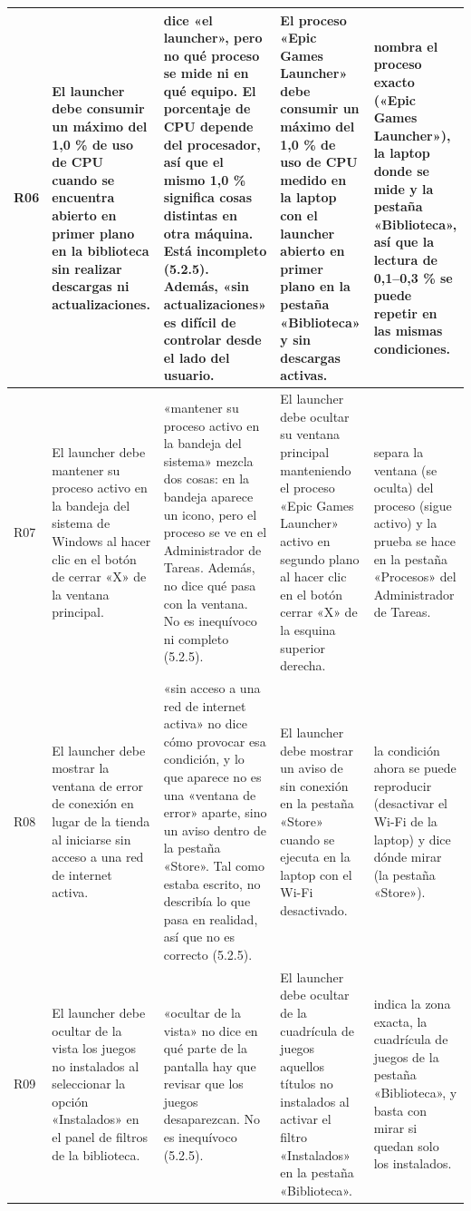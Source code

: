 \documentclass[10pt,a4paper]{article}
\begin{document}
\begin{landscape}
\begin{longtable}{|>{\raggedright\arraybackslash}p{1cm}|>{\raggedright\arraybackslash}p{5.6cm}|>{\raggedright\arraybackslash}p{5.6cm}|>{\raggedright\arraybackslash}p{7.4cm}|>{\raggedright\arraybackslash}p{5.0cm}|}
R06 & El launcher debe consumir un máximo del 1,0 \% de uso de CPU cuando se encuentra abierto en primer plano en la biblioteca sin realizar descargas ni actualizaciones. & dice «el launcher», pero no qué proceso se mide ni en qué equipo. El porcentaje de CPU depende del procesador, así que el mismo 1,0 \% significa cosas distintas en otra máquina. Está incompleto (5.2.5). Además, «sin actualizaciones» es difícil de controlar desde el lado del usuario. & El proceso «Epic Games Launcher» debe consumir un máximo del 1,0 \% de uso de CPU medido en la laptop con el launcher abierto en primer plano en la pestaña «Biblioteca» y sin descargas activas. & nombra el proceso exacto («Epic Games Launcher»), la laptop donde se mide y la pestaña «Biblioteca», así que la lectura de 0,1–0,3 \% se puede repetir en las mismas condiciones. \\ \hline
R07 & El launcher debe mantener su proceso activo en la bandeja del sistema de Windows al hacer clic en el botón de cerrar «X» de la ventana principal. & «mantener su proceso activo en la bandeja del sistema» mezcla dos cosas: en la bandeja aparece un icono, pero el proceso se ve en el Administrador de Tareas. Además, no dice qué pasa con la ventana. No es inequívoco ni completo (5.2.5). & El launcher debe ocultar su ventana principal manteniendo el proceso «Epic Games Launcher» activo en segundo plano al hacer clic en el botón cerrar «X» de la esquina superior derecha. & separa la ventana (se oculta) del proceso (sigue activo) y la prueba se hace en la pestaña «Procesos» del Administrador de Tareas. \\ \hline
R08 & El launcher debe mostrar la ventana de error de conexión en lugar de la tienda al iniciarse sin acceso a una red de internet activa. & «sin acceso a una red de internet activa» no dice cómo provocar esa condición, y lo que aparece no es una «ventana de error» aparte, sino un aviso dentro de la pestaña «Store». Tal como estaba escrito, no describía lo que pasa en realidad, así que no es correcto (5.2.5). & El launcher debe mostrar un aviso de sin conexión en la pestaña «Store» cuando se ejecuta en la laptop con el Wi-Fi desactivado. & la condición ahora se puede reproducir (desactivar el Wi-Fi de la laptop) y dice dónde mirar (la pestaña «Store»). \\ \hline
R09 & El launcher debe ocultar de la vista los juegos no instalados al seleccionar la opción «Instalados» en el panel de filtros de la biblioteca. & «ocultar de la vista» no dice en qué parte de la pantalla hay que revisar que los juegos desaparezcan. No es inequívoco (5.2.5). & El launcher debe ocultar de la cuadrícula de juegos aquellos títulos no instalados al activar el filtro «Instalados» en la pestaña «Biblioteca». & indica la zona exacta, la cuadrícula de juegos de la pestaña «Biblioteca», y basta con mirar si quedan solo los instalados. \\ \hline

\end{longtable}
\end{landscape}
\end{document}
